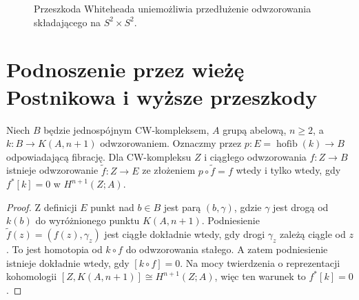 \begin{figure}[!htbp]
\centering
{}
\caption{Przeszkoda Whiteheada uniemożliwia
przedłużenie odwzorowania składającego na $S^2\times S^2$.}
\label{fig:whitehead-product-obstruction-v7}
\end{figure}

\section{Podnoszenie przez wieżę Postnikowa i wyższe przeszkody}
\begin{twierdzenie}
\label{thm:postnikov-lift-v7}
Niech $B$ będzie jednospójnym CW-kompleksem, $A$
grupą abelową, $n\ge2$, a
$k:B\to K(A,n+1)$ odwzorowaniem. Oznaczmy przez
$p:E=\operatorname{hofib}(k)\to B$ odpowiadającą
fibrację. Dla CW-kompleksu $Z$ i ciągłego odwzorowania
$f:Z\to B$ istnieje odwzorowanie $\widetilde f:Z\to E$
ze złożeniem $p\circ\widetilde f=f$ wtedy i tylko
wtedy, gdy $f^*[k]=0$ w $H^{n+1}(Z;A)$.
\end{twierdzenie}
\begin{proof}
Z definicji $E$ punkt nad $b\in B$ jest parą
$(b,\gamma)$, gdzie $\gamma$ jest drogą od $k(b)$
do wyróżnionego punktu $K(A,n+1)$. Podniesienie
$\widetilde f(z)=(f(z),\gamma_z)$ jest ciągłe
dokładnie wtedy, gdy drogi $\gamma_z$ zależą
ciągle od $z$. To jest homotopia od $k\circ f$
do odwzorowania stałego. A zatem podniesienie istnieje
dokładnie wtedy, gdy $[k\circ f]=0$.
Na mocy twierdzenia o reprezentacji kohomologii
$[Z,K(A,n+1)]\cong H^{n+1}(Z;A)$, więc ten
warunek to $f^*[k]=0$.
\end{proof}


